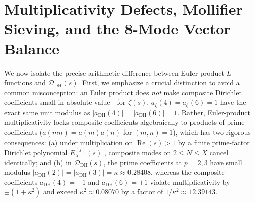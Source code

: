\documentclass[11pt,reqno]{amsart}
\theoremstyle{definition}
\theoremstyle{remark}
\numberwithin{equation}{section}
\DeclareMathOperator{\Reop}{Re}
\begin{document}
\section{Multiplicativity Defects, Mollifier Sieving, and the 8-Mode Vector Balance}
\label{sec:prime-gauge}

We now isolate the precise arithmetic difference between Euler-product $L$-functions and $\mathcal{D}_{\mathrm{DH}}(s)$. First, we emphasize a crucial distinction to avoid a common misconception: an Euler product does \emph{not} make composite Dirichlet coefficients small in absolute value—for $\zeta(s)$, $a_\zeta(4) = a_\zeta(6) = 1$ have the exact same unit modulus as $|a_{\mathrm{DH}}(4)| = |a_{\mathrm{DH}}(6)| = 1$. Rather, Euler-product multiplicativity locks composite coefficients algebraically to products of prime coefficients ($a(mn)=a(m)a(n)$ for $(m,n)=1$), which has two rigorous consequences: (a) under multiplication on $\Reop(s) > 1$ by a finite prime-factor Dirichlet polynomial $E_X^{(f)}(s)$ \cite{gonek2007}, composite modes on $2\le N\le X$ cancel identically; and (b) in $\mathcal{D}_{\mathrm{DH}}(s)$, the prime coefficients at $p=2,3$ have small modulus $|a_{\mathrm{DH}}(2)|=|a_{\mathrm{DH}}(3)|=\kappa \approx 0.28408$, whereas the composite coefficients $a_{\mathrm{DH}}(4)=-1$ and $a_{\mathrm{DH}}(6)=+1$ violate multiplicativity by $\pm(1+\kappa^2)$ and exceed $\kappa^2 \approx 0.08070$ by a factor of $1/\kappa^2 \approx 12.39143$.
\end{document}
